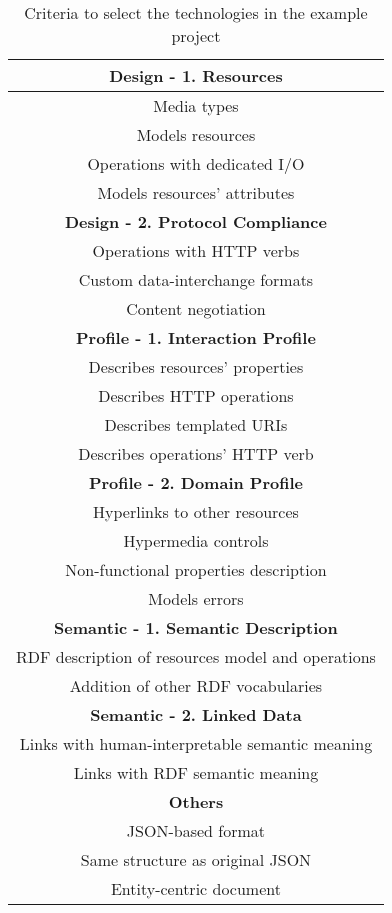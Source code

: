 \begin{table*}[h]
\begin{minipage}[t]{0.5\linewidth}
\begin{tabular}{|c|}
 \hline
 \rowcolor{grey!10} \textbf{Design - 1. Resources} \\
 \hline
 Media types \\
 Models resources \\
 Operations with dedicated I/O \\
 Models resources' attributes \\
 \hline
 \rowcolor{grey!10} \textbf{Design - 2. Protocol Compliance} \\
 \hline
 Operations with HTTP verbs \\
 Custom data-interchange formats \\
 Content negotiation \\
 \hline
 \rowcolor{grey!10} \textbf{Profile - 1. Interaction Profile} \\
 \hline
 Describes resources' properties \\
 Describes HTTP operations \\
 Describes templated URIs \\
 Describes operations' HTTP verb \\
 \hline
 \rowcolor{grey!10} \textbf{Profile - 2. Domain Profile} \\
 \hline
 Hyperlinks to other resources \\
 Hypermedia controls \\
 Non-functional properties description \\
 Models errors \\
 \hline
 \rowcolor{grey!10} \textbf{Semantic - 1. Semantic Description} \\
 \hline
 RDF description of resources model and operations \\
 Addition of other RDF vocabularies \\
 \hline
 \rowcolor{grey!10} \textbf{Semantic - 2. Linked Data} \\
 \hline
 Links with human-interpretable semantic meaning \\
 Links with RDF semantic meaning \\
 \hline
 \rowcolor{grey!10} \textbf{Others} \\
 \hline
 JSON-based format \\
 Same structure as original JSON \\
 Entity-centric document \\
 \hline
\end{tabular}
\caption{Criteria to select the technologies in the example project}
\label{example-criteria}
\end{minipage}
\end{table*}